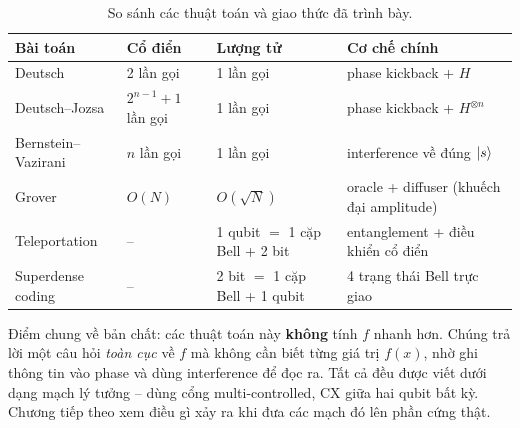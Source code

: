 \begin{table}[h]
  \centering
  \caption{So sánh các thuật toán và giao thức đã trình bày.}
  \label{tab:algo-summary}
  \small
  \begin{tabularx}{\linewidth}{@{}lllX@{}}
    \toprule
    \textbf{Bài toán} & \textbf{Cổ điển} & \textbf{Lượng tử} & \textbf{Cơ chế chính} \\
    \midrule
    Deutsch & 2 lần gọi & 1 lần gọi & phase kickback + $H$ \\
    Deutsch--Jozsa & $2^{n-1}+1$ lần gọi & 1 lần gọi & phase kickback + $H^{\otimes n}$ \\
    Bernstein--Vazirani & $n$ lần gọi & 1 lần gọi & interference về đúng $\ket{s}$ \\
    Grover & $O(N)$ & $O(\sqrt{N})$ & oracle + diffuser (khuếch đại amplitude) \\
    Teleportation & -- & 1 qubit $=$ 1 cặp Bell + 2 bit & entanglement + điều khiển cổ điển \\
    Superdense coding & -- & 2 bit $=$ 1 cặp Bell + 1 qubit & 4 trạng thái Bell trực giao \\
    \bottomrule
  \end{tabularx}
\end{table}

Điểm chung về bản chất: các thuật toán này \textbf{không} tính $f$ nhanh hơn. Chúng trả lời một câu
hỏi \emph{toàn cục} về $f$ mà không cần biết từng giá trị $f(x)$, nhờ ghi thông tin vào phase và
dùng interference để đọc ra. Tất cả đều được viết dưới dạng mạch lý tưởng -- dùng cổng
multi-controlled, CX giữa hai qubit bất kỳ. Chương tiếp theo xem điều gì xảy ra khi đưa các mạch đó
lên phần cứng thật.
